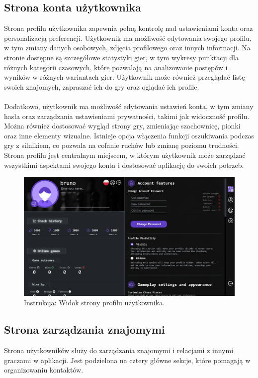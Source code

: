 \documentclass[12pt,a4paper]{article}
\begin{document}
\subsection{Strona konta użytkownika}
Strona profilu użytkownika zapewnia pełną kontrolę nad ustawieniami konta oraz personalizacją preferencji. Użytkownik ma możliwość edytowania swojego profilu, w tym zmiany danych osobowych, zdjęcia profilowego oraz innych informacji. Na stronie dostępne są szczegółowe statystyki gier, w tym wykresy punktacji dla różnych kategorii czasowych, które pozwalają na analizowanie postępów i wyników w różnych wariantach gier. Użytkownik może również przeglądać listę swoich znajomych, zapraszać ich do gry oraz oglądać ich profile.
\\\\
Dodatkowo, użytkownik ma możliwość edytowania ustawień konta, w tym zmiany hasła oraz zarządzania ustawieniami prywatności, takimi jak widoczność profilu. Można również dostosować wygląd strony gry, zmieniając szachownicę, pionki oraz inne elementy wizualne. Istnieje opcja włączenia funkcji oszukiwania podczas gry z silnikiem, co pozwala na cofanie ruchów lub zmianę poziomu trudności. Strona profilu jest centralnym miejscem, w którym użytkownik może zarządzać wszystkimi aspektami swojego konta i dostosować aplikację do swoich potrzeb.

\vspace{0.5cm}
\begin{figure}[h!]
    \centering
    \includegraphics[width=1\textwidth]{images/ins_account.png}
    \caption{Instrukcja: Widok strony profilu użytkownika.}
\end{figure}

\newpage

\subsection{Strona zarządzania znajomymi}
Strona użytkowników służy do zarządzania znajomymi i relacjami z innymi graczami w aplikacji. Jest podzielona na cztery główne sekcje, które pomagają w organizowaniu kontaktów.
\end{document}
